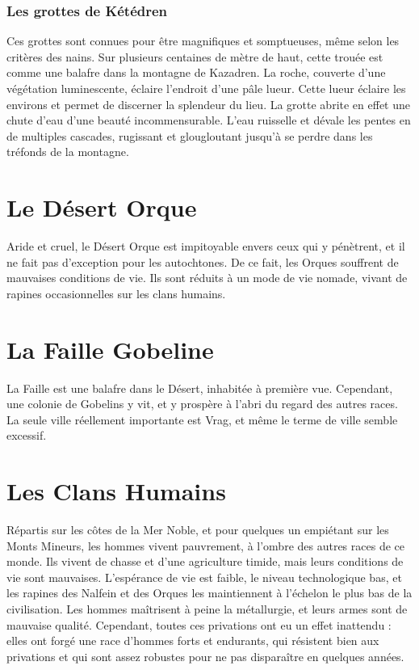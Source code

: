 \subsubsection{Les grottes de Kétédren}
Ces grottes sont connues pour être magnifiques et somptueuses, même selon les critères des nains. Sur plusieurs centaines de mètre de haut, cette trouée est comme une balafre dans la montagne de Kazadren. La roche, couverte d'une végétation luminescente, éclaire l'endroit d'une pâle lueur. Cette lueur éclaire les environs et permet de discerner la splendeur du lieu. La grotte abrite en effet une chute d'eau d'une beauté incommensurable. L'eau ruisselle et dévale les pentes en de multiples cascades, rugissant et glougloutant jusqu'à se perdre dans les tréfonds de la montagne.
\section{Le Désert Orque}
Aride et cruel, le Désert Orque est impitoyable envers ceux qui y pénètrent, et il ne fait pas d'exception pour les autochtones. De ce fait, les Orques souffrent de mauvaises conditions de vie. Ils sont réduits à un mode de vie nomade, vivant de rapines occasionnelles sur les clans humains.
\section{La Faille Gobeline}
La Faille est une balafre dans le Désert, inhabitée à première vue. Cependant, une colonie de Gobelins y vit, et y prospère à l'abri du regard des autres races. La seule ville réellement importante est Vrag, et même le terme de ville semble excessif.
\section{Les Clans Humains}
Répartis sur les côtes de la Mer Noble, et pour quelques un empiétant sur les Monts Mineurs, les hommes vivent pauvrement, à l'ombre des autres races de ce monde. Ils vivent de chasse et d'une agriculture timide, mais leurs conditions de vie sont mauvaises. L'espérance de vie est faible, le niveau technologique bas, et les rapines des Nalfein et des Orques les maintiennent à l'échelon le plus bas de la civilisation. Les hommes maîtrisent à peine la métallurgie, et leurs armes sont de mauvaise qualité. Cependant, toutes ces privations ont eu un effet inattendu : elles ont forgé une race d'hommes forts et endurants, qui résistent bien aux privations et qui sont assez robustes pour ne pas disparaître en quelques années.
